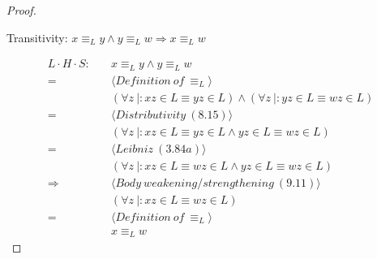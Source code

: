 \documentclass[11pt]{article}
\newenvironment{problem}[2][Problem]{\begin{trivlist}
\item[\hskip \labelsep {\bfseries #1}\hskip \labelsep {\bfseries #2.}]}{\end{trivlist}}
\begin{document}
\begin{proof}
\begin{problem}[Part]{3}
Transitivity: $x \equiv_{L} y \wedge y \equiv_{L} w \Rightarrow x \equiv_{L} w$
\end{problem}
\begin{align*}
L \cdot H  \cdot S: &\quad x \equiv_{L} y \wedge y \equiv_{L} w \\
= &\quad \langle Definition \ of \ \equiv_{L} \rangle \\
&\quad (\forall z \ |: xz \in L \equiv yz \in L) \wedge (\forall z \ |: yz \in L \equiv wz \in L) \\
= &\quad \langle Distributivity \ (8.15) \rangle \\
&\quad (\forall z \ |: xz \in L \equiv yz \in L \wedge yz \in L \equiv wz \in L) \\
= &\quad \langle Leibniz \ (3.84 a) \rangle \\
&\quad (\forall z \ |: xz \in L \equiv wz \in L \wedge yz \in L \equiv wz \in L) \\
\Rightarrow &\quad \langle Body \ weakening/strengthening \ (9.11) \rangle \\
&\quad (\forall z \ |: xz \in L \equiv wz \in L) \\
= &\quad \langle Definition \ of \ \equiv_{L} \rangle \\
&\quad x \equiv_{L} w
\end{align*}
\end{proof}
\end{document}
